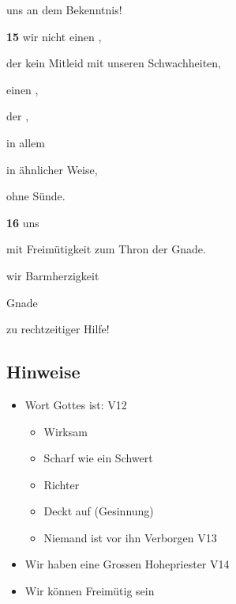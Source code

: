       uns  an dem Bekenntnis!

\textbf{15}  wir  nicht einen ,

    der kein Mitleid   mit unseren Schwachheiten, 

         einen , 

            der ,  

            in allem 

            in ähnlicher Weise, 

     ohne Sünde.

\textbf{16}   uns 

     mit Freimütigkeit  zum Thron der Gnade. 

     wir Barmherzigkeit  

         Gnade  

    zu rechtzeitiger Hilfe!

\subsection{Hinweise}
\begin{itemize}     
    \item Wort Gottes ist: V12
    \begin{itemize}       
        \item Wirksam
        \item Scharf wie ein Schwert
        \item Richter
        \item Deckt auf (Gesinnung)
        \item Niemand ist vor ihn Verborgen V13
    \end{itemize}
    \item Wir haben eine Grossen Hohepriester V14
    \item Wir können Freimütig sein
\end{itemize}

